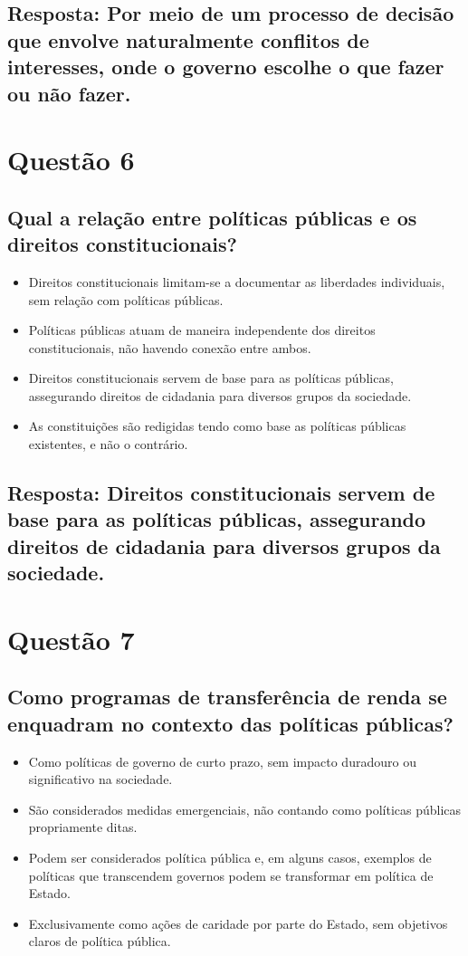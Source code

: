 \documentclass[
   article,       
   12pt,          
   oneside,       
   a4paper,       
   english,       
   brazil,        
   sumario=tradicional
   ]{abntex2}
\begin{document}
\subsection{Resposta: Por meio de um processo de decisão que envolve naturalmente conflitos de interesses, onde o governo escolhe o que fazer ou não fazer.}

\section{Questão 6}
\subsection{Qual a relação entre políticas públicas e os direitos constitucionais?}
\begin{itemize}
    \item Direitos constitucionais limitam-se a documentar as liberdades individuais, sem relação com políticas públicas.
    \item Políticas públicas atuam de maneira independente dos direitos constitucionais, não havendo conexão entre ambos.
    \item Direitos constitucionais servem de base para as políticas públicas, assegurando direitos de cidadania para diversos grupos da sociedade.
    \item As constituições são redigidas tendo como base as políticas públicas existentes, e não o contrário.
\end{itemize}
\subsection{Resposta: Direitos constitucionais servem de base para as políticas públicas, assegurando direitos de cidadania para diversos grupos da sociedade.}

\section{Questão 7}
\subsection{Como programas de transferência de renda se enquadram no contexto das políticas públicas?}
\begin{itemize}
    \item Como políticas de governo de curto prazo, sem impacto duradouro ou significativo na sociedade.
    \item São considerados medidas emergenciais, não contando como políticas públicas propriamente ditas.
    \item Podem ser considerados política pública e, em alguns casos, exemplos de políticas que transcendem governos podem se transformar em política de Estado.
    \item Exclusivamente como ações de caridade por parte do Estado, sem objetivos claros de política pública.
\end{itemize}
\end{document}
